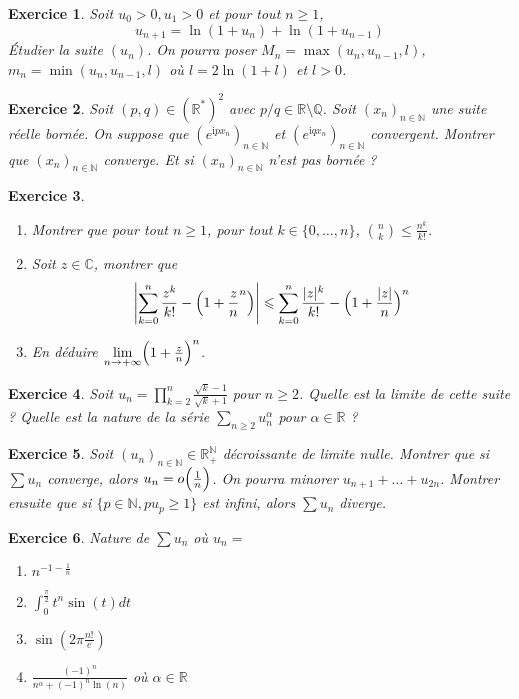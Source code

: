 \documentclass[12pt]{article}
\newtheorem{exercise}{Exercice}[section]
\theoremstyle{remark}
\theoremstyle{remark}
\newcommand{\R}{\mathbb{R}}
\newcommand{\C}{\mathbb{C}}
\newcommand{\Q}{\mathbb{Q}}
\newcommand{\N}{\mathbb{N}}
\begin{document}
\begin{exercise}
	Soit $u_0>0,u_1>0$ et pour tout $n\geqslant 1$,
	$$u_{n+1}=\ln(1+u_{n})+\ln(1+u_{n-1})$$
	Étudier la suite $(u_{n})$. On pourra poser $M_{n}=\max(u_{n},u_{n-1},l)$,
	$m_{n}=\min(u_{n},u_{n-1},l)$ où $l=2\ln(1+l)$ et $l>0$.
\end{exercise}

\begin{exercise}
	Soit $(p,q)\in(\R^{*})^{2}$ avec $p/q\in\R\setminus\Q$. Soit
	$(x_{n})_{n\in\N}$ une suite réelle bornée. On suppose que
	$(e^{\mathrm{i}px_{n}})_{n\in\N}$ et $(e^{\mathrm{i}qx_{n}})_{n\in\N}$
	convergent. Montrer que $(x_{n})_{n\in\N}$ converge. Et si
	$(x_{n})_{n\in\N}$ n'est pas bornée ?
\end{exercise}

\begin{exercise}
	\phantom{}
	\begin{enumerate}
		\item Montrer que pour tout $n\geqslant1$, pour tout
		$k\in\{0,\dots,n\}$, $\binom{n}{k}\leqslant\frac{n^{k}}{k!}$.
		\item Soit $z\in\C$, montrer que 
		$$\Biggl\vert\sum_{k=0}^{n}\frac{z^{k}}{k!}-\Bigl(1+\frac{z}{n}^{n}\Bigr)\Biggr\vert\leqslant\sum_{k=0}^{n}\frac{\vert
		z\vert^{k}}{k!}-\Bigl(1+\frac{\vert z\vert}{n}\Bigr)^{n}$$
		\item En déduire $\lim\limits_{n\to+\infty}\Bigl(1+\frac{z}{n}\Bigr)^{n}$.
	\end{enumerate}
\end{exercise}

\begin{exercise}
	Soit $u_{n}=\prod_{k=2}^{n}\frac{\sqrt{k}-1}{\sqrt{k}+1}$ pour $n\geqslant
	2$. Quelle est la limite de cette suite ? Quelle est la nature de la série
	$\sum_{n\geqslant 2}u_{n}^{\alpha}$ pour $\alpha\in\R$ ?
\end{exercise}

\begin{exercise}
	Soit $(u_{n})_{n\in\N}\in\R_{+}^{\N}$ décroissante de limite nulle. Montrer
	que si $\sum u_{n}$ converge, alors $u_{n}=o\Bigl(\frac{1}{n}\Bigr)$. On
	pourra minorer $u_{n+1}+\dots+u_{2n}$. Montrer ensuite que si $\{p\in\N,
	pu_{p}\geqslant1\}$ est infini, alors $\sum u_{n}$ diverge.
\end{exercise}

\begin{exercise}
	Nature de $\sum u_{n}$ où $u_{n}=$
	\begin{enumerate}
		\item $n^{-1-\frac{1}{n}}$
		\item $\int_{0}^{\frac{\pi}{2}}t^{n}\sin(t)dt$
		\item $\sin(2\pi\frac{n!}{e})$
		\item $\frac{(-1)^{n}}{n^{\alpha}+(-1)^{n}\ln(n)}$ où $\alpha\in\R$
	\end{enumerate}
\end{exercise}
\end{document}
